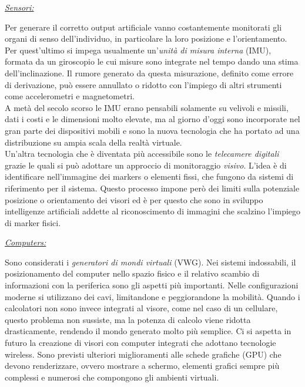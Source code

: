 \begin{flushleft}
	\underline{\textit{Sensori:}}
\end{flushleft}  Per generare il corretto output artificiale vanno costantemente monitorati gli organi di senso dell'individuo, in particolare la loro posizione e l'orientamento. Per quest'ultimo si impega usualmente un'\textit{unità di misura interna} (IMU), formata da un giroscopio le cui misure sono integrate nel tempo dando una stima dell'inclinazione. Il rumore generato da questa misurazione, definito come errore di derivazione, può essere annullato o ridotto con l'impiego di altri strumenti come accelerometri e magnetometri.\\
A metà del secolo scorso le IMU erano pensabili solamente su velivoli e missili, dati i costi e le dimensioni molto elevate, ma al giorno d'oggi sono incorporate nel gran parte dei dispositivi mobili e sono la nuova tecnologia che ha portato ad una distribuzione su ampia scala della realtà virtuale.\\
Un'altra tecnologia che è diventata più accessibile sono le \textit{telecamere digitali} grazie le quali si può adottare un approccio di monitoraggio \textit{visivo}.
L'idea è di identificare nell'immagine dei markers o elementi fissi, che fungono da sistemi di riferimento per il sistema. Questo processo impone però dei limiti sulla potenziale posizione o orientamento dei visori ed è per questo che sono in sviluppo intelligenze artificiali addette al riconoscimento di immagini che scalzino l'impiego di marker fisici.

\begin{flushleft}
	\underline{\textit{Computers:}}
\end{flushleft} Sono considerati i \textit{generatori di mondi virtuali} (VWG). Nei sistemi indossabili, il posizionamento del computer nello spazio fisico e il relativo scambio di informazioni con la periferica sono gli aspetti più importanti. Nelle configurazioni moderne si utilizzano dei cavi, limitandone e peggiorandone la mobilità. Quando i calcolatori non sono invece integrati al visore, come nel caso di un cellulare, questo problema non sussiste, ma la potenza di calcolo viene ridotta drasticamente, rendendo il mondo generato molto più semplice. Ci si aspetta in futuro la creazione di visori con computer integrati che adottano tecnologie wireless. Sono previsti ulteriori miglioramenti alle schede grafiche (GPU) che devono renderizzare, ovvero mostrare a schermo, elementi grafici sempre più complessi e numerosi che compongono gli ambienti virtuali.
